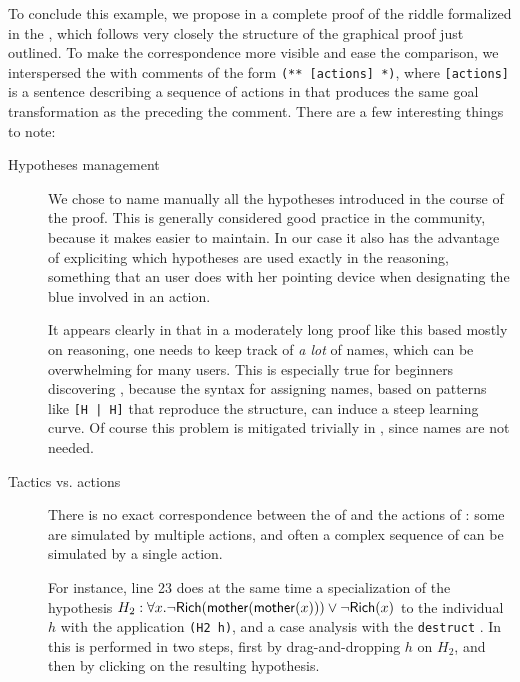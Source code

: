 To conclude this example, we propose in  a complete proof of
the riddle formalized in the  , which follows very closely the
structure of the graphical proof just outlined. To make the correspondence more
visible and ease the comparison, we interspersed the  with comments
of the form \texttt{(** [actions] *)}, where \texttt{[actions]} is a
sentence describing a sequence of actions in  that produces the same goal
transformation as the  preceding the comment. There are a few interesting
things to note:
\begin{description}
  \item[Hypotheses management] We chose to name manually all the hypotheses
  introduced in the course of the proof. This is generally considered good
  practice in the  community, because it makes  easier
  to maintain. In our case it also has the advantage of expliciting which
  hypotheses are used exactly in the reasoning, something that an 
  user does with her pointing device when designating the blue 
  involved in an action.
  
  It appears clearly in  that in a moderately long proof
  like this based mostly on  reasoning, one needs to keep track of
  \emph{a lot} of names, which can be overwhelming for many users. This is
  especially true for beginners discovering , because the syntax for
  assigning names, based on patterns like \texttt{[H | H]} that reproduce the
   structure, can induce a steep learning curve. Of course this
  problem is mitigated trivially in , since names are not needed.

  \item[Tactics vs. actions] There is no exact correspondence between the
   of  and the actions of : some  are
  simulated by multiple actions, and often a complex sequence of 
  can be simulated by a single action.
  
  For instance, line 23 does at the same time a specialization of the hypothesis
  $H_2 : \forall x. \neg \mbox{\textsf{Rich}}(\mbox{\textsf{mother}}(\mbox{\textsf{mother}}(x))) \lor \neg \mbox{\textsf{Rich}}(x)$ to the
  individual $h$ with the application \texttt{(H2 h)}, and a case analysis with
  the \texttt{destruct} . In  this is performed in two steps, first
  by drag-and-dropping $h$ on $H_2$, and then by clicking on the resulting
  hypothesis.


\end{description}
